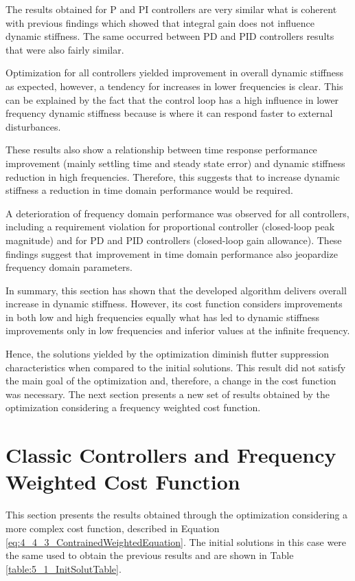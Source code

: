 The results obtained for P and PI controllers are very similar what is coherent with previous findings which showed that integral gain does not influence dynamic stiffness. The same occurred between PD and PID controllers results that were also fairly similar.

Optimization for all controllers yielded improvement in overall dynamic stiffness as expected, however, a tendency for increases in lower frequencies is clear. This can be explained by the fact that the control loop has a high influence in lower frequency dynamic stiffness because is where it can respond faster to external disturbances.

These results also show a relationship between time response performance improvement (mainly settling time and steady state error) and dynamic stiffness reduction in high frequencies. Therefore, this suggests that to increase dynamic stiffness a reduction in time domain performance would be required. 

A deterioration of frequency domain performance was observed for all controllers, including a requirement violation for proportional controller (closed-loop peak magnitude) and for PD and PID controllers (closed-loop gain allowance). These findings suggest that improvement in time domain performance also jeopardize frequency domain parameters.

In summary, this section has shown that the developed algorithm delivers overall increase in dynamic stiffness. However, its cost function considers improvements in both low and high frequencies equally what has led to dynamic stiffness improvements only in low frequencies and inferior values at the infinite frequency. 

Hence, the solutions yielded by the optimization diminish flutter suppression characteristics when compared to the initial solutions. This result did not satisfy the main goal of the optimization and, therefore, a change in the cost function was necessary. The next section presents a new set of results obtained by the optimization considering a frequency weighted cost function.

\section{Classic Controllers and Frequency Weighted Cost Function}

This section presents the results obtained through the optimization considering a more complex cost function, described in Equation \ref{eq:4_4_3_ContrainedWeightedEquation}. The initial solutions in this case were the same used to obtain the previous results and are shown in Table \ref{table:5_1_InitSolutTable}.

